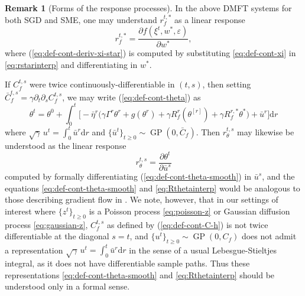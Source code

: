 \documentclass[11pt,letterpaper,reqno]{amsart}
\theoremstyle{definition}
\newtheorem{remark}[thm]{Remark}
\def\eps{\varepsilon}
\def\d{\mathrm{d}}
\def\GP{\operatorname{GP}}
\begin{document}
\begin{remark}[Forms of the response processes]\label{rmk:response}
In the above DMFT systems for both SGD and SME,
one may understand $r_f^{t,*}$ as a linear response
\begin{equation}\label{eq:rstarinterp}
r_f^{t,*}=\frac{\partial f(\xi^t,w^*,\eps)}{\partial w^*},
\end{equation}
where (\ref{eq:def-cont-deriv-xi-star}) is computed by 
substituting \eqref{eq:def-cont-xi} in \eqref{eq:rstarinterp} and
differentiating in $w^*$.

If $C_f^{t,s}$ were twice continuously-differentiable in $(t,s)$, then
setting $\bar C_f^{t,s}=\gamma \partial_t \partial_s C_f^{t,s}$, we may write
(\ref{eq:def-cont-theta}) as
\begin{equation}\label{eq:def-cont-theta-smooth}
\theta^t=\theta^0+\int_0^t \Big[{-}\bar\eta^r\Big({\gamma}
\Gamma^r\theta^r+g(\theta^r)+{\gamma}R_f^r(\theta^{[r]})
+{\gamma}R_f^{r,*}\theta^*\Big)+\bar u^r\Big]\d r
\end{equation}
where $\sqrt{\gamma}\,u^t=\int_0^t \bar u^r \d r$ and $\{\bar u^t\}_{t \geq 0}
\sim \GP(0,\bar C_f)$. Then $r_\theta^{t,s}$ may likewise be understood as the
linear response
\begin{equation}\label{eq:Rthetainterp}
r_\theta^{t,s}=\frac{\partial \theta^t}{\partial \bar u^s}
\end{equation}
computed by formally differentiating (\ref{eq:def-cont-theta-smooth})
in $\bar u^s$, and the equations \eqref{eq:def-cont-theta-smooth} and
\eqref{eq:Rthetainterp} would be analogous to those describing gradient flow in
\cite{celentano2021high}. We note, however, that in our
settings of interest where $\{z^t\}_{t \geq 0}$ is a Poisson process
\eqref{eq:poisson-z} or Gaussian diffusion process \eqref{eq:gaussian-z},
$C_f^{t,s}$ as defined by (\ref{eq:def-cont-C-h})
is not twice differentiable at the diagonal $s=t$, and $\{u^t\}_{t \geq 0}
\sim \GP(0,C_f)$ does not admit a representation $\sqrt{\gamma}\,u^t=\int_0^t
\bar u^r \d r$ in the sense of a usual Lebesgue-Stieltjes integral, as it
does not have differentiable sample paths. Thus these
representations \eqref{eq:def-cont-theta-smooth} and \eqref{eq:Rthetainterp} 
should be understood only in a formal sense.


\end{remark}
\end{document}
